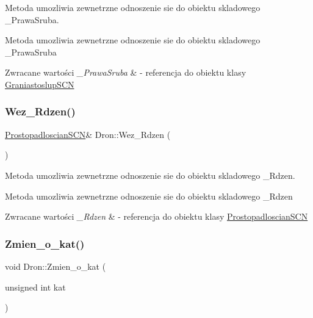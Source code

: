 Metoda umozliwia zewnetrzne odnoszenie sie do obiektu skladowego \+\_\+\+Prawa\+Sruba. 

Metoda umozliwia zewnetrzne odnoszenie sie do obiektu skladowego \+\_\+\+Prawa\+Sruba 
\begin{DoxyRetVals}{Zwracane wartości}
{\em \+\_\+\+Prawa\+Sruba} & -\/ referencja do obiektu klasy \hyperlink{classGraniastoslupSCN}{Graniastoslup\+S\+CN} \\
\hline
\end{DoxyRetVals}
\mbox{\label{classDron_addd3f76aedda33de1c13d7a0cd5bea69}} 
\subsubsection{\texorpdfstring{Wez\+\_\+\+Rdzen()}{Wez\_Rdzen()}}
{\footnotesize\ttfamily \hyperlink{classProstopadloscianSCN}{Prostopadloscian\+S\+CN}\& Dron\+::\+Wez\+\_\+\+Rdzen (\begin{DoxyParamCaption}{ }\end{DoxyParamCaption})\hspace{0.3cm}{\ttfamily [inline]}}



Metoda umozliwia zewnetrzne odnoszenie sie do obiektu skladowego \+\_\+\+Rdzen. 

Metoda umozliwia zewnetrzne odnoszenie sie do obiektu skladowego \+\_\+\+Rdzen 
\begin{DoxyRetVals}{Zwracane wartości}
{\em \+\_\+\+Rdzen} & -\/ referencja do obiektu klasy \hyperlink{classProstopadloscianSCN}{Prostopadloscian\+S\+CN} \\
\hline
\end{DoxyRetVals}
\mbox{\label{classDron_a75782b1ce9cd9f911e45f87f75ae95d6}} 
\subsubsection{\texorpdfstring{Zmien\+\_\+o\+\_\+kat()}{Zmien\_o\_kat()}}
{\footnotesize\ttfamily void Dron\+::\+Zmien\+\_\+o\+\_\+kat (\begin{DoxyParamCaption}\item[{unsigned int}]{kat }\end{DoxyParamCaption})}



